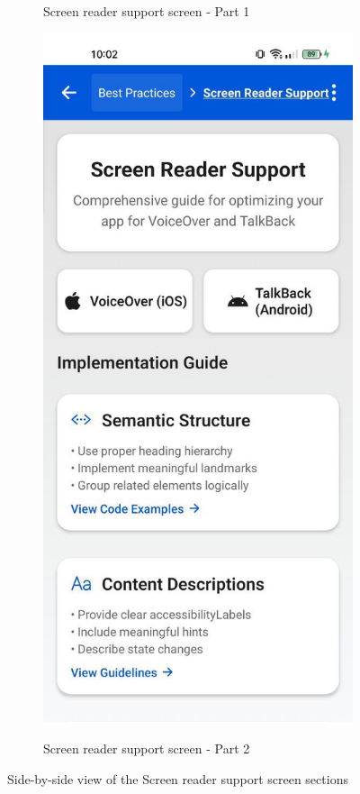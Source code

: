 \begin{figure}[ht]
\begin{subfigure}[b]{0.48\textwidth}
        \caption{Screen reader support screen - Part 1}
        \label{fig:screen-reader-left}
    \end{subfigure}
    \hfill
    \begin{subfigure}[b]{0.48\textwidth}
        \centering
        \includegraphics[width=\linewidth, alt={Second part of the Screen reader support screen}]{img/screenreader2.jpg}
        \caption{Screen reader support screen - Part 2}
        \label{fig:screen-reader-right}
    \end{subfigure}
    \caption{Side-by-side view of the Screen reader support screen sections}
    \label{fig:screen_reader_screens_sidebyside}
\end{figure}

